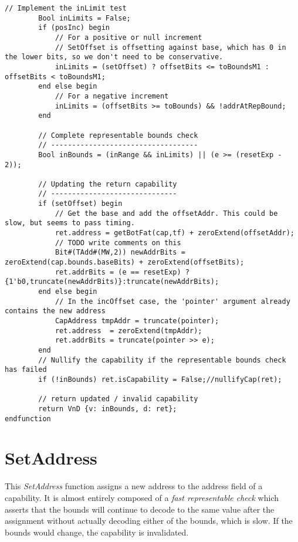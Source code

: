 \begin{lstlisting}[language=bluespec]
        // Implement the inLimit test
        Bool inLimits = False;
        if (posInc) begin
            // For a positive or null increment
            // SetOffset is offsetting against base, which has 0 in the lower bits, so we don't need to be conservative.
            inLimits = (setOffset) ? offsetBits <= toBoundsM1 : offsetBits < toBoundsM1;
        end else begin
            // For a negative increment
            inLimits = (offsetBits >= toBounds) && !addrAtRepBound;
        end

        // Complete representable bounds check
        // -----------------------------------
        Bool inBounds = (inRange && inLimits) || (e >= (resetExp - 2));

        // Updating the return capability
        // ------------------------------
        if (setOffset) begin
            // Get the base and add the offsetAddr. This could be slow, but seems to pass timing.
            ret.address = getBotFat(cap,tf) + zeroExtend(offsetAddr);
            // TODO write comments on this
            Bit#(TAdd#(MW,2)) newAddrBits = zeroExtend(cap.bounds.baseBits) + zeroExtend(offsetBits);
            ret.addrBits = (e == resetExp) ? {1'b0,truncate(newAddrBits)}:truncate(newAddrBits);
        end else begin
            // In the incOffset case, the 'pointer' argument already contains the new address
            CapAddress tmpAddr = truncate(pointer);
            ret.address  = zeroExtend(tmpAddr);
            ret.addrBits = truncate(pointer >> e);
        end
        // Nullify the capability if the representable bounds check has failed
        if (!inBounds) ret.isCapability = False;//nullifyCap(ret);

        // return updated / invalid capability
        return VnD {v: inBounds, d: ret};
endfunction
\end{lstlisting}

\section{SetAddress}
\label{sec:cheri-128-listings-setaddress}

This \emph{SetAddress} function assigns a new address to the address field
of a capability.
It is almost entirely composed of a \emph{fast representable check} which asserts
that the bounds will continue to decode to the same value after the assignment
without actually decoding either of the bounds, which is slow.
If the bounds would change, the capability is invalidated.

